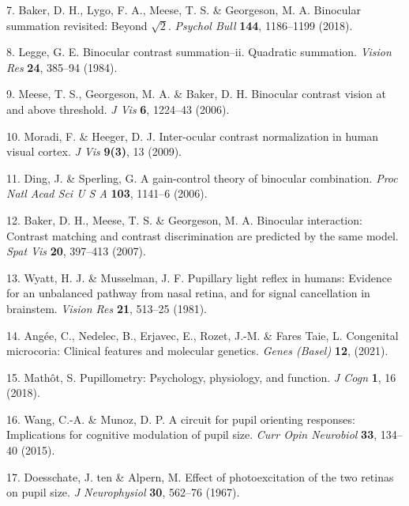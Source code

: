 \documentclass[
]{article}
\begin{document}
\leavevmode\hypertarget{ref-Baker2018}{}%
7. Baker, D. H., Lygo, F. A., Meese, T. S. \& Georgeson, M. A. Binocular summation revisited: Beyond \(\sqrt{2}\). \emph{Psychol Bull} \textbf{144}, 1186--1199 (2018).

\leavevmode\hypertarget{ref-Legge1984}{}%
8. Legge, G. E. Binocular contrast summation--ii. Quadratic summation. \emph{Vision Res} \textbf{24}, 385--94 (1984).

\leavevmode\hypertarget{ref-Meese2006}{}%
9. Meese, T. S., Georgeson, M. A. \& Baker, D. H. Binocular contrast vision at and above threshold. \emph{J Vis} \textbf{6}, 1224--43 (2006).

\leavevmode\hypertarget{ref-Moradi2009}{}%
10. Moradi, F. \& Heeger, D. J. Inter-ocular contrast normalization in human visual cortex. \emph{J Vis} \textbf{9(3)}, 13 (2009).

\leavevmode\hypertarget{ref-Ding2006}{}%
11. Ding, J. \& Sperling, G. A gain-control theory of binocular combination. \emph{Proc Natl Acad Sci U S A} \textbf{103}, 1141--6 (2006).

\leavevmode\hypertarget{ref-Baker2007}{}%
12. Baker, D. H., Meese, T. S. \& Georgeson, M. A. Binocular interaction: Contrast matching and contrast discrimination are predicted by the same model. \emph{Spat Vis} \textbf{20}, 397--413 (2007).

\leavevmode\hypertarget{ref-Wyatt1981}{}%
13. Wyatt, H. J. \& Musselman, J. F. Pupillary light reflex in humans: Evidence for an unbalanced pathway from nasal retina, and for signal cancellation in brainstem. \emph{Vision Res} \textbf{21}, 513--25 (1981).

\leavevmode\hypertarget{ref-Angee2021}{}%
14. Angée, C., Nedelec, B., Erjavec, E., Rozet, J.-M. \& Fares Taie, L. Congenital microcoria: Clinical features and molecular genetics. \emph{Genes (Basel)} \textbf{12}, (2021).

\leavevmode\hypertarget{ref-Mathot2018}{}%
15. Mathôt, S. Pupillometry: Psychology, physiology, and function. \emph{J Cogn} \textbf{1}, 16 (2018).

\leavevmode\hypertarget{ref-Wang2015}{}%
16. Wang, C.-A. \& Munoz, D. P. A circuit for pupil orienting responses: Implications for cognitive modulation of pupil size. \emph{Curr Opin Neurobiol} \textbf{33}, 134--40 (2015).

\leavevmode\hypertarget{ref-Doesschate1967}{}%
17. Doesschate, J. ten \& Alpern, M. Effect of photoexcitation of the two retinas on pupil size. \emph{J Neurophysiol} \textbf{30}, 562--76 (1967).
\end{document}
